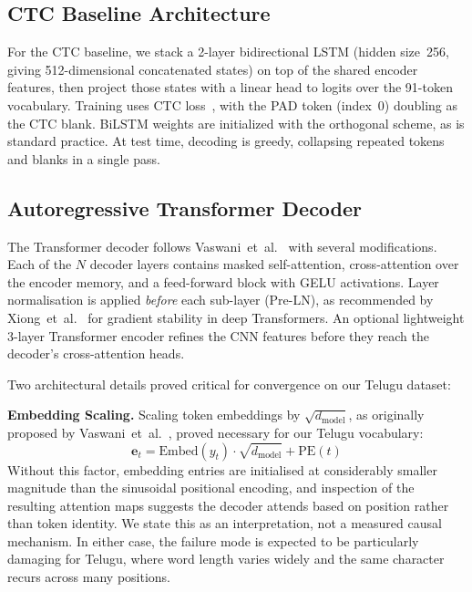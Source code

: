 \documentclass[conference]{IEEEtran}
\begin{document}
\subsection{CTC Baseline Architecture}

For the CTC baseline, we stack a 2-layer bidirectional LSTM (hidden size~256, giving 512-dimensional concatenated states) on top of the shared encoder features, then project those states with a linear head to logits over the 91-token vocabulary. Training uses CTC loss~\cite{graves2006ctc}, with the PAD token (index~0) doubling as the CTC blank. BiLSTM weights are initialized with the orthogonal scheme, as is standard practice. At test time, decoding is greedy, collapsing repeated tokens and blanks in a single pass.

\subsection{Autoregressive Transformer Decoder}

The Transformer decoder follows Vaswani~et~al.~\cite{vaswani2017attention} with several modifications. Each of the $N$ decoder layers contains masked self-attention, cross-attention over the encoder memory, and a feed-forward block with GELU activations. Layer normalisation is applied \textit{before} each sub-layer (Pre-LN), as recommended by Xiong~et~al.~\cite{xiong2020layer} for gradient stability in deep Transformers. An optional lightweight 3-layer Transformer encoder refines the CNN features before they reach the decoder's cross-attention heads.

Two architectural details proved critical for convergence on our Telugu dataset:

\textbf{Embedding Scaling.} Scaling token embeddings by $\sqrt{d_{\text{model}}}$, as originally proposed by Vaswani~et~al.~\cite{vaswani2017attention}, proved necessary for our Telugu vocabulary:
\begin{equation}
    \mathbf{e}_t = \text{Embed}(y_t) \cdot \sqrt{d_{\text{model}}} + \text{PE}(t)
\end{equation}
Without this factor, embedding entries are initialised at considerably smaller magnitude than the sinusoidal positional encoding, and inspection of the resulting attention maps suggests the decoder attends based on position rather than token identity. We state this as an interpretation, not a measured causal mechanism. In either case, the failure mode is expected to be particularly damaging for Telugu, where word length varies widely and the same character recurs across many positions.
\end{document}
